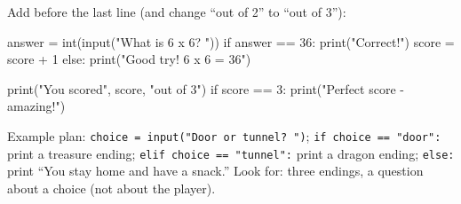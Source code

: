 \begin{answer}
Add before the last line (and change \enquote{out of 2} to \enquote{out of 3}):
\begin{pycode}
answer = int(input("What is 6 x 6? "))
if answer == 36:
    print("Correct!")
    score = score + 1
else:
    print("Good try! 6 x 6 = 36")

print("You scored", score, "out of 3")
if score == 3:
    print("Perfect score - amazing!")
\end{pycode}
\end{answer}

\begin{answer}
Example plan: \texttt{choice = input("Door or tunnel? ")}; \texttt{if choice == "door":} print a treasure ending; \texttt{elif choice == "tunnel":} print a dragon ending; \texttt{else:} print \enquote{You stay home and have a snack.} Look for: three endings, a question about a choice (not about the player).
\end{answer}
